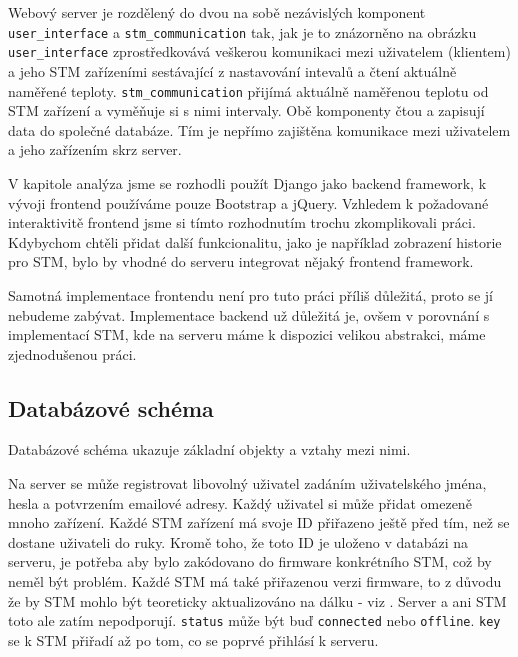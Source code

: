 
Webový server je rozdělený do dvou na sobě nezávislých komponent \texttt{user\_interface} a
\texttt{stm\_communication} tak, jak je to znázorněno na obrázku %
\texttt{user\_interface} zprostředkovává veškerou komunikaci mezi uživatelem (klientem) a jeho STM
zařízeními sestávající z nastavování intevalů a čtení aktuálně naměřené teploty.
\texttt{stm\_communication} přijímá aktuálně naměřenou teplotu od STM zařízení a vyměňuje si s nimi intervaly.
Obě komponenty čtou a zapisují data do společné databáze.
Tím je nepřímo zajištěna komunikace mezi uživatelem a jeho zařízením skrz server.


V kapitole analýza jsme se rozhodli použít Django jako backend framework, k vývoji frontend
používáme pouze Bootstrap a jQuery.
Vzhledem k požadované interaktivitě frontend jsme si tímto rozhodnutím trochu zkomplikovali práci.
Kdybychom chtěli přidat další funkcionalitu, jako je například zobrazení historie pro STM,
bylo by vhodné do serveru integrovat nějaký frontend framework.

Samotná implementace frontendu není pro tuto práci příliš důležitá, proto se jí nebudeme zabývat.
Implementace backend už důležitá je, ovšem v porovnání s implementací STM, kde na serveru máme
k dispozici velikou abstrakci, máme zjednodušenou práci.

\subsection{Databázové schéma}


Databázové schéma 
ukazuje základní objekty a vztahy mezi nimi.

Na server se může registrovat libovolný uživatel zadáním uživatelského jména, hesla a potvrzením
emailové adresy.
Každý uživatel si může přidat omezeně mnoho zařízení.
Každé STM zařízení má svoje ID přiřazeno ještě před tím, než se dostane uživateli do ruky.
Kromě toho, že toto ID je uloženo v databázi na serveru, je potřeba aby bylo zakódovano do firmware
konkrétního STM, což by neměl být problém.
Každé STM má také přiřazenou verzi firmware, to z důvodu že by STM mohlo být teoreticky aktualizováno
na dálku - viz \cite{FW-update-over-ethernet}.
Server a ani STM toto ale zatím nepodporují.
\texttt{status} může být buď \texttt{connected} nebo \texttt{offline}.
\texttt{key} se k STM přiřadí až po tom, co se poprvé přihlásí k serveru.

